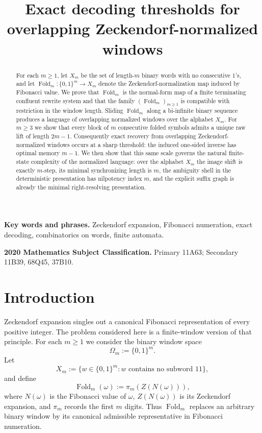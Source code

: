 \documentclass[11pt,letterpaper]{article}
\title{Exact decoding thresholds for overlapping Zeckendorf-normalized windows}
\author{}
\date{}
\numberwithin{equation}{section}
\theoremstyle{plain}
\theoremstyle{definition}
\theoremstyle{remark}
\DeclareMathOperator{\Fold}{Fold}
\begin{document}
\maketitle

\begin{abstract}
For each $m\ge 1$, let $X_m$ be the set of length-$m$ binary words with no
consecutive $1$'s, and let $\Fold_m:\{0,1\}^m\to X_m$ denote the
Zeckendorf-normalization map induced by Fibonacci value.  We prove that
$\Fold_m$ is the normal-form map of a finite terminating confluent rewrite
system and that the family $(\Fold_m)_{m\ge 1}$ is compatible with restriction
in the window length.  Sliding $\Fold_m$ along a bi-infinite binary sequence
produces a language of overlapping normalized windows over the alphabet $X_m$.
For $m\ge 3$ we show that every block of $m$ consecutive folded symbols admits
a unique raw lift of length $2m-1$.  Consequently exact recovery from
overlapping Zeckendorf-normalized windows occurs at a sharp threshold: the
induced one-sided inverse has optimal memory $m-1$.  We then show that this
same scale governs the natural finite-state complexity of the normalized
language: over the alphabet $X_m$ the image shift is exactly $m$-step, its
minimal synchronizing length is $m$, the ambiguity shell in the deterministic
presentation has nilpotency index $m$, and the explicit suffix graph is already
the minimal right-resolving presentation.
\end{abstract}

\medskip
\noindent\textbf{Key words and phrases.}
Zeckendorf expansion, Fibonacci numeration, exact decoding, combinatorics on
words, finite automata.

\medskip
\noindent\textbf{2020 Mathematics Subject Classification.}
Primary 11A63; Secondary 11B39, 68Q45, 37B10.

\section{Introduction}

Zeckendorf expansion singles out a canonical Fibonacci representation of every
positive integer.  The problem considered here is a finite-window version of
that principle.  For each $m\ge 1$ we consider the binary window space
\[
\Omega_m:=\{0,1\}^m.
\]
Let
\[
X_m:=\{w\in\{0,1\}^m:\text{$w$ contains no subword }11\},
\]
and define
\[
\Fold_m(\omega):=\pi_m(Z(N(\omega))),
\]
where $N(\omega)$ is the Fibonacci value of $\omega$, $Z(N(\omega))$ is its
Zeckendorf expansion, and $\pi_m$ records the first $m$ digits.  Thus
$\Fold_m$ replaces an arbitrary binary window by its canonical admissible
representative in Fibonacci numeration.
\end{document}
